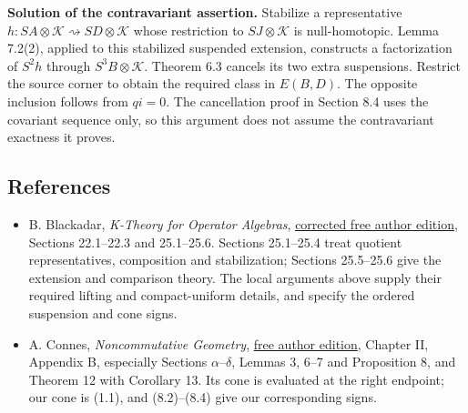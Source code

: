 \documentclass[
  11pt,
]{article}
\providecommand{\tightlist}{%
  \setlength{\itemsep}{0pt}\setlength{\parskip}{0pt}}
\begin{document}
\textbf{Solution of the contravariant assertion.} Stabilize a
representative
\(h:SA\otimes\mathcal K \rightsquigarrow SD\otimes\mathcal K\) whose
restriction to \(SJ\otimes\mathcal K\) is null-homotopic. Lemma 7.2(2),
applied to this stabilized suspended extension, constructs a
factorization of \(S^2h\) through \(S^3B\otimes\mathcal K\). Theorem 6.3
cancels its two extra suspensions. Restrict the source corner to obtain
the required class in \(E(B,D)\). The opposite inclusion follows from
\(qi=0\). The cancellation proof in Section 8.4 uses the covariant
sequence only, so this argument does not assume the contravariant
exactness it proves.

\subsection{References}\label{references}

\begin{itemize}
\tightlist
\item
  B. Blackadar, \emph{K-Theory for Operator Algebras},
  \href{https://www.bruceblackadar.com/Mathematics/book6.pdf}{corrected
  free author edition}, Sections 22.1--22.3 and 25.1--25.6. Sections
  25.1--25.4 treat quotient representatives, composition and
  stabilization; Sections 25.5--25.6 give the extension and comparison
  theory. The local arguments above supply their required lifting and
  compact-uniform details, and specify the ordered suspension and cone
  signs.
\item
  A. Connes, \emph{Noncommutative Geometry},
  \href{https://alainconnes.org/wp-content/uploads/book94bigpdf.pdf}{free
  author edition}, Chapter II, Appendix B, especially Sections
  \(\alpha\)--\(\delta\), Lemmas 3, 6--7 and Proposition 8, and Theorem
  12 with Corollary 13. Its cone is evaluated at the right endpoint; our
  cone is (1.1), and (8.2)--(8.4) give our corresponding signs.
\end{itemize}
\end{document}
